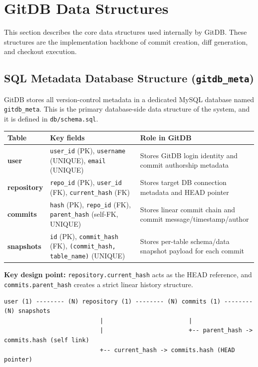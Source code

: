 \documentclass[12pt, a4paper]{article}
\begin{document}
\section{GitDB Data Structures}

This section describes the core data structures used internally by GitDB.
These structures are the implementation backbone of commit creation, diff
generation, and checkout execution.

\subsection{SQL Metadata Database Structure (\texttt{gitdb\_meta})}

GitDB stores all version-control metadata in a dedicated MySQL database named
\texttt{gitdb\_meta}. This is the primary database-side data structure of the
system, and it is defined in \texttt{db/schema.sql}.

\begin{center}
\renewcommand{\arraystretch}{1.3}
\begin{tabularx}{\textwidth}{>{\bfseries}p{2.7cm} >{\ttfamily}p{4.0cm} X}
\toprule
Table & Key fields & Role in GitDB \\
\midrule
user & \texttt{user\_id} (PK), \texttt{username} (UNIQUE), \texttt{email} (UNIQUE) & Stores GitDB login identity and commit authorship metadata \\
repository & \texttt{repo\_id} (PK), \texttt{user\_id} (FK), \texttt{current\_hash} (FK) & Stores target DB connection metadata and HEAD pointer \\
commits & \texttt{hash} (PK), \texttt{repo\_id} (FK), \texttt{parent\_hash} (self-FK, UNIQUE) & Stores linear commit chain and commit message/timestamp/author \\
snapshots & \texttt{id} (PK), \texttt{commit\_hash} (FK), \texttt{(commit\_hash, table\_name)} (UNIQUE) & Stores per-table schema/data snapshot payload for each commit \\
\bottomrule
\end{tabularx}
\end{center}

\begin{tcolorbox}[infobox]
\textbf{Key design point:}
\texttt{repository.current\_hash} acts as the HEAD reference, and
\texttt{commits.parent\_hash} creates a strict linear history structure.
\end{tcolorbox}

\begin{tcolorbox}[commandbox, title=Relationship Structure (Conceptual)]
\begin{lstlisting}
user (1) -------- (N) repository (1) -------- (N) commits (1) -------- (N) snapshots
                           |                        |
                           |                        +-- parent_hash -> commits.hash (self link)
                           +-- current_hash -> commits.hash (HEAD pointer)
\end{lstlisting}
\end{tcolorbox}
\end{document}
